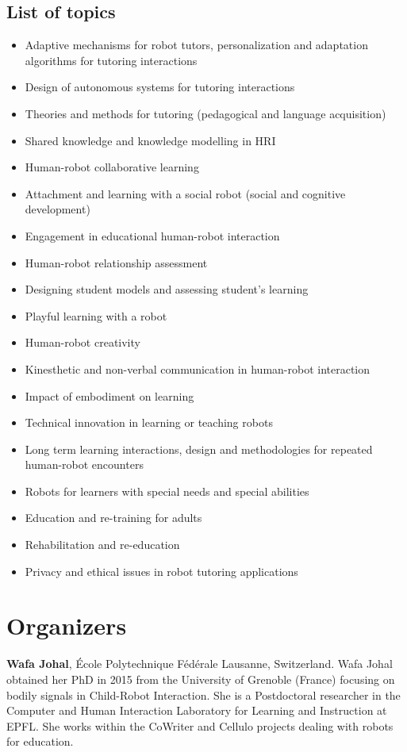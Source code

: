 \documentclass{sig-alternate-05-2015}
\begin{document}
\subsection*{List of topics}
\begin{itemize}[nosep]
	\item Adaptive mechanisms for robot tutors, personalization and adaptation algorithms for tutoring interactions
	\item Design of autonomous systems for tutoring interactions
	\item Theories and methods for tutoring (pedagogical and  language acquisition)
	\item Shared knowledge and knowledge modelling in HRI 
	\item Human-robot collaborative learning
	\item Attachment and learning with a social robot (social and cognitive development)
	\item Engagement in educational human-robot interaction
	\item Human-robot relationship assessment
	\item Designing student models and assessing student’s learning    
	\item Playful learning with a robot
	\item Human-robot creativity     
	\item Kinesthetic and non-verbal communication in human-robot interaction    
	\item Impact of embodiment on learning   
	\item Technical innovation in learning or teaching robots
	\item Long term learning interactions, design and methodologies for repeated human-robot encounters
	\item Robots for learners with special needs and special abilities
	\item Education and re-training for adults      
	\item Rehabilitation and re-education
	\item Privacy and ethical issues in robot tutoring applications
\end{itemize}



\section*{Organizers}
\textbf{Wafa Johal}, École Polytechnique Fédérale Lausanne, Switzerland. Wafa Johal obtained her PhD in 2015 from the University of Grenoble (France) focusing on bodily signals in Child-Robot Interaction. She is a Postdoctoral researcher in the Computer and Human Interaction Laboratory for Learning and Instruction  at EPFL. She works within the CoWriter and Cellulo projects dealing with robots for education. 
\end{document}
